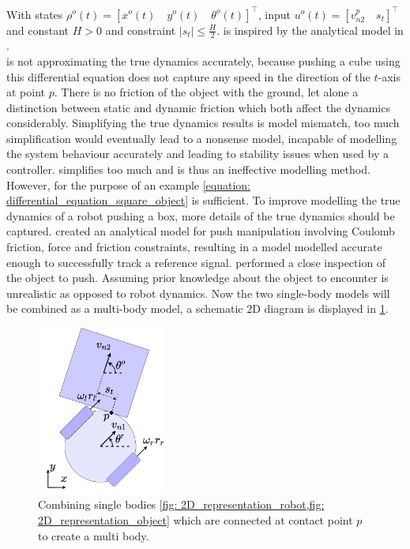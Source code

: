 \noindent With states $\rho^o(t) = \left[x^o(t) \quad y^o(t) \quad \theta^o(t)\right]^\top$, input $u^o(t)=\left[v^p_{n2} \quad s_t\right]^\top $ \\and constant $H > 0$ and constraint $|s_t| \leq \frac{H}{2}$.  is inspired by the analytical model in \cite{bauza_data-efficient_2018}.\\

 is not approximating the true dynamics accurately, because pushing a cube using this differential equation does not capture any speed in the direction of the $t$-axis at point $p$. There is no friction of the object with the ground, let alone a distinction between static and dynamic friction which both affect the dynamics considerably. Simplifying the true dynamics results is model mismatch, too much simplification would eventually lead to a nonsense model, incapable of modelling the system behaviour accurately and leading to stability issues when used by a controller.  simplifies too much and is thus an ineffective modelling method. However, for the purpose of an example \cref{equation: differential_equation_square_object} is sufficient. To improve modelling the true dynamics of a robot pushing a box, more details of the true dynamics should be captured. \cite{bauza_data-efficient_2018} created an analytical model for push manipulation involving Coulomb friction, force and friction constraints, resulting in a model modelled accurate enough to successfully track a reference signal. \cite{bauza_data-efficient_2018} performed a close inspection of the object to push. Assuming prior knowledge about the object to encounter is unrealistic as opposed to robot dynamics. Now the two single-body models will be combined as a multi-body model, a schematic 2D diagram is displayed in \cref{fig: multiple_body_diagram}. \\

\begin{figure}[H]
    \centering
    \includegraphics[width=0.38\textwidth]{figures/schematic_diff_drive_and_square.png}
    \caption{Combining single bodies \cref{fig: 2D_representation_robot,fig: 2D_representation_object} which are connected at contact point $p$ to create a multi body.}
    \label{fig: multiple_body_diagram}
\end{figure}

